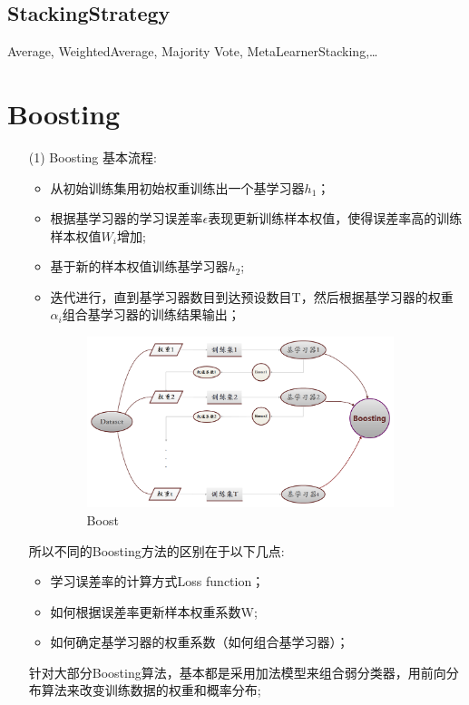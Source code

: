 \documentclass[a4paper]{article}
\begin{document}
	\subsection{StackingStrategy}
		Average, WeightedAverage, Majority Vote, MetaLearnerStacking,\dots
\section{Boosting}
	\begin{itemize}
		\item[(1)] Boosting 基本流程:
			\begin{itemize}
				\item 从初始训练集用初始权重训练出一个基学习器$h_1$；
				\item 根据基学习器的学习误差率$\epsilon$表现更新训练样本权值，使得误差率高的训练样本权值$W_i$增加;
				\item 基于新的样本权值训练基学习器$h_2$;
				\item 迭代进行，直到基学习器数目到达预设数目T，然后根据基学习器的权重$\alpha_i$组合基学习器的训练结果输出；
				\begin{figure}[h]
					\centering
					\includegraphics[width=0.9\textwidth]{Dataset.png}
					\caption{Boost}
				\end{figure}
			\end{itemize}
			所以不同的Boosting方法的区别在于以下几点:
			\begin{itemize}
				\item 学习误差率的计算方式Loss function；
				\item 如何根据误差率更新样本权重系数W;
				\item 如何确定基学习器的权重系数（如何组合基学习器）；
			\end{itemize}
			针对大部分Boosting算法，基本都是采用加法模型来组合弱分类器，用前向分布算法来改变训练数据的权重和概率分布;


\end{itemize}
\end{document}

